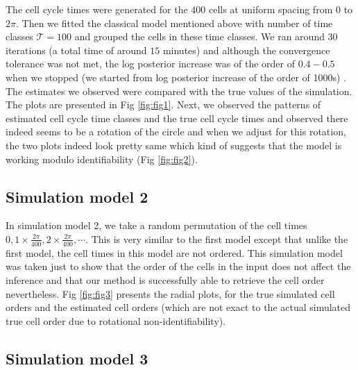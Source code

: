 \documentclass[11pt]{article}
\begin{document}
The cell cycle times were generated for the $400$ cells at uniform spacing from $0$ to $2 \pi$. Then we fitted the classical model mentioned above with number of time classes $\mathcal{T} =100$ and grouped the cells in these time classes. We ran around $30$ iterations (a total time of around $15$ minutes) and although the convergence tolerance was not met, the log posterior increase was of the order of $0.4-0.5$ when we stopped (we started from log posterior increase of the order of 1000s) . The estimates we observed were compared with the true values of the simulation. The plots are presented in Fig \ref{fig:fig1}. Next, we observed the patterns of estimated cell cycle time classes and the true cell cycle times and observed there indeed seems to be a rotation of the circle and when we adjust for this rotation, the two plots indeed look pretty same which kind of suggests that the model is working modulo identifiability (Fig \ref{fig:fig2}).

\subsection{Simulation model 2}

In simulation model 2, we take a random permutation of the cell times $0, 1 \times \frac{2 \pi}{400}, 2 \times \frac{2 \pi}{400}, \cdots $. This is very similar to the first model except that unlike the first model, the cell times in this model are not ordered. This simulation model was taken just to show that the order of the cells in the input does not affect the inference and that our method is successfully able to retrieve the cell order nevertheless. Fig \ref{fig:fig3} presents the radial plots, for the true simulated cell orders and the estimated cell orders (which are not exact to the actual simulated true cell order due to rotational non-identifiability).

\subsection{Simulation model 3}
\end{document}
